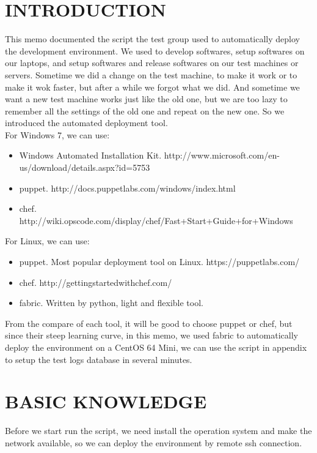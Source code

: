 \section{INTRODUCTION}
This memo documented the script the test group used to automatically deploy the development environment.
We used to develop softwares, setup softwares on our laptops, and setup softwares and release softwares on our test machines or servers.
Sometime we did a change on the test machine, to make it work or to make it wok faster, but after a while we forgot what we did. 
And sometime we want a new test machine works just like the old one, but we are too lazy to remember all the settings of the old one and repeat on the new one.
So we introduced the automated deployment tool.\\
For Windows 7, we can use:
\begin{itemize}
    \item
    Windows Automated Installation Kit.    
    http://www.microsoft.com/en-us/download/details.aspx?id=5753
    \item
    puppet. 
    http://docs.puppetlabs.com/windows/index.html 
    \item
    chef.
    http://wiki.opscode.com/display/chef/Fast+Start+Guide+for+Windows
\end{itemize}
For Linux, we can use:
\begin{itemize}
    \item
    puppet. Most popular deployment tool on Linux. 
    https://puppetlabs.com/
    \item
    chef. 
    http://gettingstartedwithchef.com/ 
    \item
    fabric. Written by python, light and flexible tool.
\end{itemize}
From the compare of each tool, it will be good to choose puppet or chef, but since their steep learning curve,
in this memo, we used fabric to automatically deploy the environment on a CentOS 64 Mini, we can use the script in appendix to setup the test logs database in several minutes.

\section{BASIC KNOWLEDGE}
Before we start run the script, we need install the operation system and make the network available, so we can deploy the environment by remote ssh connection.
